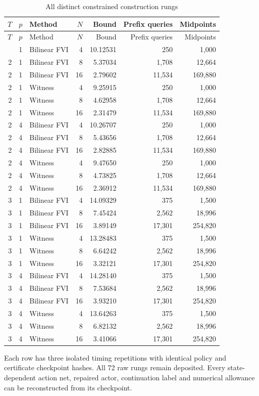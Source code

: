 \begin{longtable}{rrlrrrr}\caption{All distinct constrained construction rungs}\label{tab:constrainedfull47}\\\toprule
$T$ & $p$ & Method & $N$ & Bound & Prefix queries & Midpoints\\\midrule\endfirsthead
\toprule $T$ & $p$ & Method & $N$ & Bound & Prefix queries & Midpoints\\\midrule\endhead\bottomrule\endfoot
2 & 1 & Bilinear FVI & 4 & 10.12531 & 250 & 1,000 \\
2 & 1 & Bilinear FVI & 8 & 5.37034 & 1,708 & 12,664 \\
2 & 1 & Bilinear FVI & 16 & 2.79602 & 11,534 & 169,880 \\
2 & 1 & Witness & 4 & 9.25915 & 250 & 1,000 \\
2 & 1 & Witness & 8 & 4.62958 & 1,708 & 12,664 \\
2 & 1 & Witness & 16 & 2.31479 & 11,534 & 169,880 \\
2 & 4 & Bilinear FVI & 4 & 10.26707 & 250 & 1,000 \\
2 & 4 & Bilinear FVI & 8 & 5.43656 & 1,708 & 12,664 \\
2 & 4 & Bilinear FVI & 16 & 2.82885 & 11,534 & 169,880 \\
2 & 4 & Witness & 4 & 9.47650 & 250 & 1,000 \\
2 & 4 & Witness & 8 & 4.73825 & 1,708 & 12,664 \\
2 & 4 & Witness & 16 & 2.36912 & 11,534 & 169,880 \\
3 & 1 & Bilinear FVI & 4 & 14.09329 & 375 & 1,500 \\
3 & 1 & Bilinear FVI & 8 & 7.45424 & 2,562 & 18,996 \\
3 & 1 & Bilinear FVI & 16 & 3.89149 & 17,301 & 254,820 \\
3 & 1 & Witness & 4 & 13.28483 & 375 & 1,500 \\
3 & 1 & Witness & 8 & 6.64242 & 2,562 & 18,996 \\
3 & 1 & Witness & 16 & 3.32121 & 17,301 & 254,820 \\
3 & 4 & Bilinear FVI & 4 & 14.28140 & 375 & 1,500 \\
3 & 4 & Bilinear FVI & 8 & 7.53684 & 2,562 & 18,996 \\
3 & 4 & Bilinear FVI & 16 & 3.93210 & 17,301 & 254,820 \\
3 & 4 & Witness & 4 & 13.64263 & 375 & 1,500 \\
3 & 4 & Witness & 8 & 6.82132 & 2,562 & 18,996 \\
3 & 4 & Witness & 16 & 3.41066 & 17,301 & 254,820 \\
\end{longtable}
Each row has three isolated timing repetitions with identical policy and certificate checkpoint hashes. All 72 raw rungs remain deposited. Every state-dependent action net, repaired actor, continuation label and numerical allowance can be reconstructed from its checkpoint.
